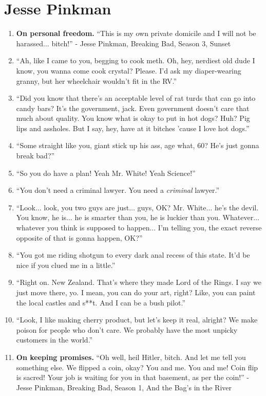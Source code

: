 \documentclass{book}
\numberwithin{equation}{section}
\begin{document}
\section{Jesse Pinkman}
\begin{enumerate}
    \item \textbf{On personal freedom.} ``This is my own private domicile and I will not be harassed$\ldots$ bitch!'' - Jesse Pinkman, Breaking Bad, Season 3, Sunset
    \item ``Ah, like I came to you, begging to cook meth. Oh, hey, nerdiest old dude I know, you wanna come cook crystal? Please. I'd ask my diaper-wearing granny, but her wheelchair wouldn't fit in the RV.''
    \item ``Did you know that there's an acceptable level of rat turds that can go into candy bars? It's the government, jack. Even government doesn't care that much about quality. You know what is okay to put in hot dogs? Huh? Pig lips and assholes. But I say, hey, have at it bitches 'cause I love hot dogs.''
    \item ``Some straight like you, giant stick up his ass, age what, 60? He's just gonna break bad?''
    \item ``So you do have a plan! Yeah Mr. White! Yeah Science!''
    \item ``You don't need a criminal lawyer. You need a \emph{criminal} lawyer.''
    \item ``Look$\ldots$ look, you two guys are just$\ldots$ guys, OK? Mr. White$\ldots$ he's the devil. You know, he is$\ldots$ he is smarter than you, he is luckier than you. Whatever$\ldots$ whatever you think is supposed to happen$\ldots$ I'm telling you, the exact reverse opposite of that is gonna happen, OK?''
    \item ``You got me riding shotgun to every dark anal recess of this state. It'd be nice if you clued me in a little.''
    \item ``Right on. New Zealand. That's where they made Lord of the Rings. I say we just move there, yo. I mean, you can do your art, right? Like, you can paint the local castles and s**t. And I can be a bush pilot.''
    \item ``Look, I like making cherry product, but let's keep it real, alright? We make poison for people who don't care. We probably have the most unpicky customers in the world.''
    \item \textbf{On keeping promises.} ``Oh well, heil Hitler, bitch. And let me tell you something else. We flipped a coin, okay? You and me. You and me! Coin flip is sacred! Your job is waiting for you in that basement, as per the coin!'' - Jesse Pinkman, Breaking Bad, Season 1, And the Bag's in the River

\end{enumerate}
\end{document}
